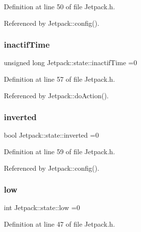 Definition at line 50 of file Jetpack.\+h.



Referenced by Jetpack\+::config().

\mbox{\label{structJetpack_1_1state_aaf817b1f9e7a4d65b9e3ca4726b281f6}} 
\subsubsection{\texorpdfstring{inactif\+Time}{inactifTime}}
{\footnotesize\ttfamily unsigned long Jetpack\+::state\+::inactif\+Time =0}



Definition at line 57 of file Jetpack.\+h.



Referenced by Jetpack\+::do\+Action().

\mbox{\label{structJetpack_1_1state_a6bc03bb8f05b10aa142dbb0c39c87fb5}} 
\subsubsection{\texorpdfstring{inverted}{inverted}}
{\footnotesize\ttfamily bool Jetpack\+::state\+::inverted =0}



Definition at line 59 of file Jetpack.\+h.



Referenced by Jetpack\+::config().

\mbox{\label{structJetpack_1_1state_ace3ecd2b1f262756d8f7a8adda20136a}} 
\subsubsection{\texorpdfstring{low}{low}}
{\footnotesize\ttfamily int Jetpack\+::state\+::low =0}



Definition at line 47 of file Jetpack.\+h.



